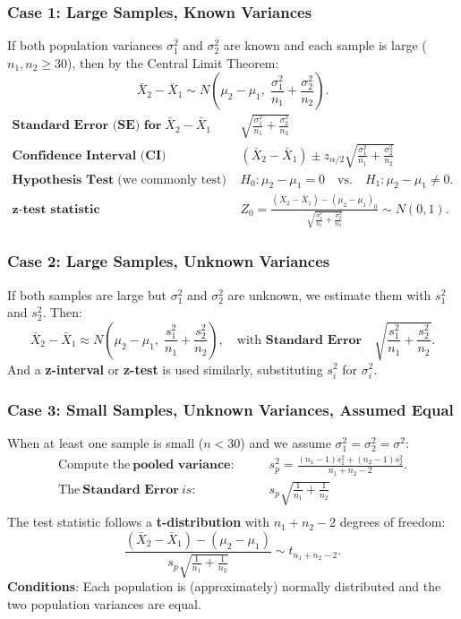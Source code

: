 \documentclass[10pt]{extarticle}
\begin{document}
\subsubsection{Case 1: Large Samples, Known Variances}
If both population variances $\sigma_1^2$ and $\sigma_2^2$ are known and each sample is large ($n_1, n_2 \ge 30$), then by the Central Limit Theorem:
$$
\bar{X}_2 - \bar{X}_1 \sim N\!\left(\mu_2 - \mu_1, \; \frac{\sigma_1^2}{n_1} + \frac{\sigma_2^2}{n_2}\right).
$$
\begin{align*}
   \textbf{Standard Error (SE) for} \; \bar{X}_2 - \bar{X}_1 \quad\quad & \sqrt{\frac{\sigma_1^2}{n_1} + \frac{\sigma_2^2}{n_2}} \\
   \textbf{Confidence Interval (CI)} \quad\quad & (\bar{X}_2 - \bar{X}_1) \pm z_{\alpha/2} \sqrt{\frac{\sigma_1^2}{n_1} + \frac{\sigma_2^2}{n_2}} \\
   \textbf{Hypothesis Test} \; \text{(we commonly test)} \quad\quad & H_0 : \mu_2 - \mu_1 = 0 \quad \text{vs.} \quad H_1 : \mu_2 - \mu_1 \neq 0. \\
   \textbf{z-test statistic} \quad\quad & Z_0 = \frac{(\bar{X}_2 - \bar{X}_1) - (\mu_2 - \mu_1)_0}{\sqrt{\frac{\sigma_1^2}{n_1} + \frac{\sigma_2^2}{n_2}}} \sim N(0,1).
\end{align*}

\subsubsection{Case 2: Large Samples, Unknown Variances}
If both samples are large but $\sigma_1^2$ and $\sigma_2^2$ are unknown, we estimate them with $s_1^2$ and $s_2^2$. Then:
$$
\bar{X}_2 - \bar{X}_1 \approx N\!\left(\mu_2 - \mu_1, \; \frac{s_1^2}{n_1} + \frac{s_2^2}{n_2}\right), \quad \text{with }\textbf{Standard Error} \quad \sqrt{\frac{s_1^2}{n_1} + \frac{s_2^2}{n_2}}.
$$
And a \textbf{z-interval} or \textbf{z-test} is used similarly, substituting $s_i^2$ for $\sigma_i^2$.

\subsubsection{Case 3: Small Samples, Unknown Variances, Assumed Equal}
When at least one sample is small ($n < 30$) and we assume $\sigma_1^2 = \sigma_2^2 = \sigma^2$:
\begin{align*}
    \text{Compute the} \ \textbf{pooled variance}: &\quad\quad s_p^2 = \frac{(n_1 - 1)s_1^2 + (n_2 - 1)s_2^2}{n_1 + n_2 - 2}. \\
    \text{The} \ \textbf{Standard Error} \ is: &\quad\quad s_p \sqrt{\frac{1}{n_1} + \frac{1}{n_2}} \\
\end{align*}
The test statistic follows a \textbf{t-distribution} with $n_1 + n_2 - 2$ degrees of freedom:
$$\frac{(\bar{X}_2 - \bar{X}_1) - (\mu_2 - \mu_1)}{s_p \sqrt{\frac{1}{n_1} + \frac{1}{n_2}}} \sim t_{n_1 + n_2 - 2}.
$$
\textbf{Conditions}: Each population is (approximately) normally distributed and the two population variances are equal.
\end{document}

